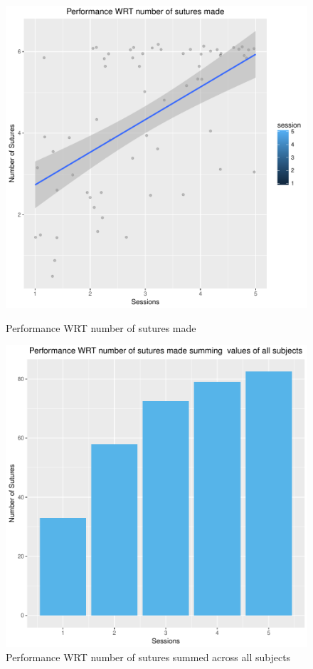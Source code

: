 \documentclass[12pt,epsf]{report}
\begin{document}
\begin{figure}[!htb]
	\begin{minipage}[c]{0.5\linewidth}
	\includegraphics[width=\linewidth]{PerformanceWRTSutures.pdf}
	\caption{Performance WRT number of sutures made}
	\end{minipage}
	\hfill
	\begin{minipage}[c]{0.5\linewidth}
	\includegraphics[width=\linewidth]{PerformanceWRTSutures_bar.pdf}
	\caption{Performance WRT number of sutures summed across all subjects}
	\end{minipage}
\end{figure}
\end{document}
